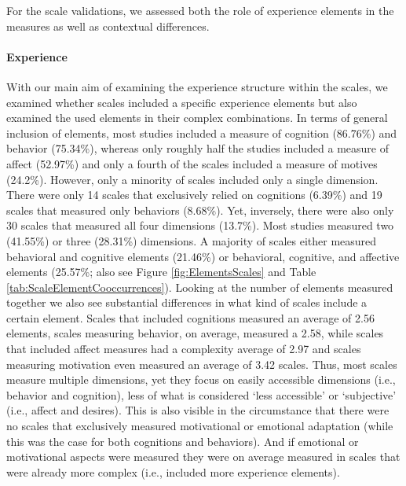 For the scale validations, we assessed both the role of experience
elements in the measures as well as contextual differences.

\paragraph{Experience}

With our main aim of examining the experience structure within the
scales, we examined whether scales included a specific experience
elements but also examined the used elements in their complex
combinations. In terms of general inclusion of elements, most studies
included a measure of cognition (86.76\%) and behavior (75.34\%),
whereas only roughly half the studies included a measure of affect
(52.97\%) and only a fourth of the scales included a measure of motives
(24.2\%). However, only a minority of scales included only a single
dimension. There were only 14 scales that exclusively relied on
cognitions (6.39\%) and 19 scales that measured only behaviors (8.68\%).
Yet, inversely, there were also only 30 scales that measured all four
dimensions (13.7\%). Most studies measured two (41.55\%) or three
(28.31\%) dimensions. A majority of scales either measured behavioral
and cognitive elements (21.46\%) or behavioral, cognitive, and affective
elements (25.57\%; also see Figure \ref{fig:ElementsScales} and Table
\ref{tab:ScaleElementCooccurrences}). Looking at the number of elements
measured together we also see substantial differences in what kind of
scales include a certain element. Scales that included cognitions
measured an average of 2.56 elements, scales measuring behavior, on
average, measured a 2.58, while scales that included affect measures had
a complexity average of 2.97 and scales measuring motivation even
measured an average of 3.42 scales. Thus, most scales measure multiple
dimensions, yet they focus on easily accessible dimensions (i.e.,
behavior and cognition), less of what is considered `less accessible' or
`subjective' (i.e., affect and desires). This is also visible in the
circumstance that there were no scales that exclusively measured
motivational or emotional adaptation (while this was the case for both
cognitions and behaviors). And if emotional or motivational aspects were
measured they were on average measured in scales that were already more
complex (i.e., included more experience elements).

